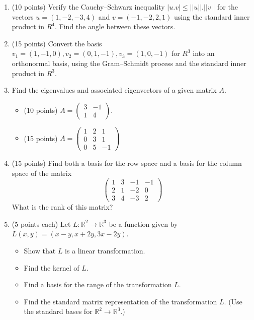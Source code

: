 \documentclass[fleqn]{article}
\begin{document}
\begin{enumerate}
    \item (10 points) Verify the Cauchy–Schwarz inequality $|u.v| \leq ||u||.||v||$ for the 
    vectors $u=(1, -2, -3, 4)$ and $v=(-1, -2, 2, 1)$ using the standard inner product in $R^4$.
    Find the angle between these vectors.

    \item (15 points) Convert the basis $v_1=(1, -1, 0), v_2=(0, 1, -1), v_3=(1, 0, -1)$ for $R^3$ into 
    an orthonormal basis, using the Gram–Schmidt process and the standard inner product in $R^3$.

    \item Find the eigenvalues and associated eigenvectors of a given matrix $A$.
      \begin{itemize}
        \item (10 points) $A=\begin{pmatrix}
          3 & -1
          \\
          1 & 4
        \end{pmatrix}$.

        \item (15 points) $A=\begin{pmatrix}
          1 & 2 & 1 
          \\
          0 & 3 & 1 
          \\
          0 & 5 & -1
        \end{pmatrix}$
      \end{itemize}


    \item (15 points) Find both a basis for the row space and a basis for the column space of the
    matrix
    $$
      \begin{pmatrix}
        1 & 3 & -1 & -1
        \\
        2 & 1 & -2 & 0
        \\
        3 & 4 & -3 & 2
      \end{pmatrix}
    $$
    What is the rank of this matrix?


    \item (5 points each) Let $L: \mathbb{R}^2 \rightarrow \mathbb{R}^3$ be a function given by $L(x,y)=(x-y, x+2y, 3x-2y)$.
      \begin{itemize}
        \item Show that $L$ is a linear transformation.
        \item Find the kernel of $L$.
        \item Find a basis for the range of the transformation $L$.
        \item Find the standard matrix representation of the transformation $L$. (Use the standard bases for $\mathbb{R}^2 \rightarrow \mathbb{R}^3$.)
      \end{itemize}



\end{enumerate}
\end{document}
